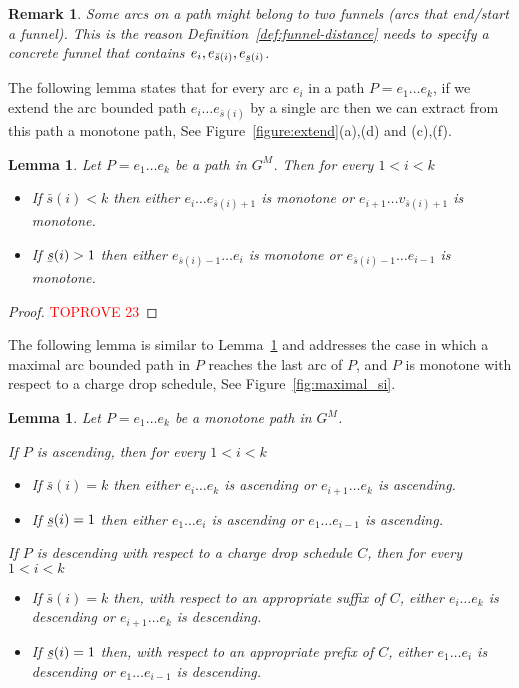 \documentclass[11pt]{article}
\newtheorem{lemma}[theorem]{Lemma}
\newtheorem{remark}{Remark}
\newcommand{\ubar}[1]{\underaccent{\bar}{{#1}}}
\begin{document}
\begin{remark}
    Some arcs on a path might belong to two funnels (arcs that end/start a funnel). This is the reason Definition~\ref{def:funnel-distance} needs to specify a concrete funnel that contains $e_i,e_{\bar{s}(i)},e_{\ubar{s}(i)}$.
\end{remark}

The following lemma states that for every arc $e_i$ in a path $P=e_1 \ldots e_k$, if we extend the arc bounded path $e_i \ldots e_{\bar{s}(i)}$ by a single arc then we can extract from this path a monotone path, See Figure~\ref{figure:extend}(a),(d) and (c),(f).

\begin{lemma}\label{lemma:-bounded-to-monotone}
    Let $P = e_1 \ldots e_k$ be a path in $G^M$. Then for every  $1 < i < k$
    \begin{itemize}
        \item If $\bar{s}(i) < k$ then either $e_i \ldots e_{\bar{s}(i)+1}$ is monotone or $e_{i+1} \ldots v_{\bar{s}(i)+1}$ is monotone.
        \item If $\ubar{s}(i) > 1$ then either $e_{\bar{s}(i)-1}\ldots e_i$ is monotone or $e_{\bar{s}(i)-1}\ldots e_{i-1}$ is monotone.
    \end{itemize}
\end{lemma}


\begin{proof}\textcolor{red}{TOPROVE 23}\end{proof}

The following lemma is similar to Lemma~\ref{lemma:-bounded-to-monotone} and addresses the case in which a maximal arc bounded path in $P$ reaches the last arc of $P$, and $P$ is monotone with respect to a charge drop schedule, See Figure~\ref{fig:maximal_si}.


\begin{lemma}\label{lemma:-bounded-to-monotone_v2}
    Let $P = e_1 \ldots e_k$ be a monotone path in $G^M$.

    If $P$ is ascending, then for every $1<i<k$
    \begin{itemize}
        \item If $\bar{s}(i) = k$ then either $e_i \ldots e_{k}$ is ascending or $e_{i+1} \ldots e_{k}$ is ascending.
        \item If $\ubar{s}(i) = 1$ then either $e_{1}\ldots e_i$ is ascending or $e_{1} \ldots e_{i-1}$ is ascending.
    \end{itemize}
    
    If $P$ is descending  with respect to a charge drop schedule $C$, then for every $1<i<k$ 
    
    \begin{itemize}
        \item If $\bar{s}(i) = k$ then, with respect to an appropriate suffix of $C$, either $e_i \ldots e_{k}$ is descending or $e_{i+1} \ldots e_{k}$ is descending.
        \item If $\ubar{s}(i) = 1$ then, with respect to an appropriate prefix of  $C$, either $e_{1}\ldots e_i$ is descending or $e_{1} \ldots e_{i-1}$ is descending.
    \end{itemize}
\end{lemma}
\end{document}
